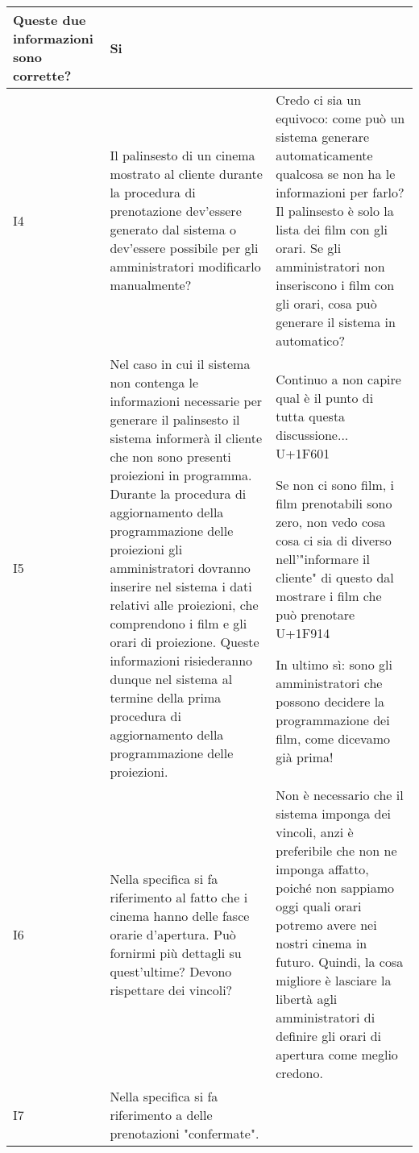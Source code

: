\begin{longtable}{|p{1cm}|p{7.66cm}|p{7.66cm}|}
      Queste due informazioni sono corrette?                                  &
      Si
      \\\hline
      I4                                                                      &
      Il palinsesto di un cinema mostrato al cliente durante la procedura di
      prenotazione dev'essere generato dal sistema o dev'essere possibile per
      gli amministratori modificarlo manualmente?                             &
      Credo ci sia un equivoco: come può un sistema generare automaticamente
      qualcosa se non ha le informazioni per farlo? Il palinsesto è solo la
      lista dei film con gli orari. Se gli amministratori non inseriscono i
      film con gli orari, cosa può generare il sistema in automatico?
      \\\hline
      I5                                                                      &
      Nel caso in cui il sistema non contenga le informazioni necessarie per
      generare il palinsesto il sistema informerà il cliente che non sono
      presenti proiezioni in programma.
      Durante la procedura di aggiornamento della programmazione delle
      proiezioni gli amministratori dovranno inserire nel sistema i dati
      relativi alle proiezioni, che comprendono i film e gli orari di
      proiezione.
      Queste informazioni risiederanno dunque nel sistema al termine della
      prima procedura di aggiornamento della programmazione delle proiezioni. &
      Continuo a non capire qual è il punto di tutta questa discussione...
      U+1F601

      Se non ci sono film, i film prenotabili sono zero, non vedo cosa cosa ci
      sia di diverso nell'"informare il cliente" di questo dal mostrare i film
      che può prenotare U+1F914

      In ultimo sì: sono gli amministratori che possono decidere la
      programmazione dei film, come dicevamo già prima!
      \\\hline
      I6                                                                      &
      Nella specifica si fa riferimento al fatto che i cinema hanno delle
      fasce orarie d'apertura. Può fornirmi più dettagli su quest'ultime?
      Devono rispettare dei vincoli?                                          &
      Non è necessario che il sistema imponga dei vincoli, anzi è preferibile
      che non ne imponga affatto, poiché non sappiamo oggi quali orari potremo
      avere nei nostri cinema in futuro.
      Quindi, la cosa migliore è lasciare la libertà agli amministratori di
      definire gli orari di apertura come meglio credono.
      \\\hline
      I7                                                                      &
      Nella specifica si fa riferimento a delle prenotazioni "confermate".


\end{longtable}
